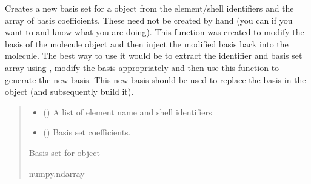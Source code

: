 \documentclass[letterpaper,10pt,english]{sphinxmanual}
\begin{document}
\begin{fulllineitems}
\label{\detokenize{api:MSTOOpt.putcoeffs}}
\pysigstartsignatures
\pysiglinewithargsret
{}
{\sphinxparamcomma {}}
{}
\pysigstopsignatures
\sphinxAtStartPar
Creates a new basis set for a  object from the element/shell identifiers and the array of basis coefficients. These need not be created by hand (you can if you want to and know what you are doing). This function was created to modify the basis of the molecule object and then inject the modified basis back into the molecule. The best way to use it would be to extract the identifier and basis set array using , modify the basis appropriately and then use this function to generate the new basis. This new basis should be used to replace the basis in the  object (and subsequently build it).
\begin{quote}\begin{description}
\begin{itemize}
\item {} 
\sphinxAtStartPar
{} () \textendash{} A list of element name and shell identifiers

\item {} 
\sphinxAtStartPar
{} () \textendash{} Basis set coefficients.

\end{itemize}

\sphinxAtStartPar
Basis set for  object

\sphinxAtStartPar
numpy.ndarray

\end{description}\end{quote}


\end{fulllineitems}
\end{document}
